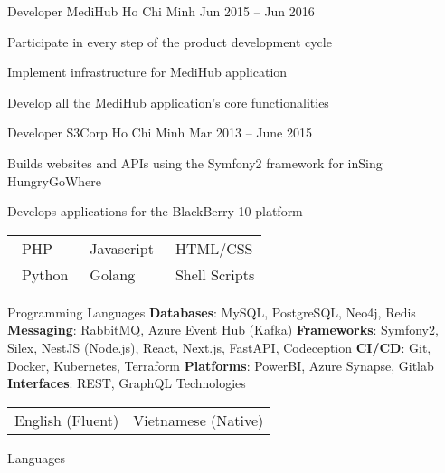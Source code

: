 \documentclass[]{awesome-cv}
\begin{document}
\begin{cventries}
{\begin{cvitems}
		\end{cvitems}}
	\cventry
	{Developer}
	{MediHub}
	{Ho Chi Minh}
	{Jun 2015 – Jun 2016}
	{\begin{cvitems}
		\item {Participate in every step of the product development cycle}
		\item {Implement infrastructure for MediHub application}
		\item {Develop all the MediHub application's core functionalities}
		\end{cvitems}}
	\cventry
	{Developer}
	{S3Corp}
	{Ho Chi Minh}
	{Mar 2013 – June 2015}
	{
		\begin{cvitems}
			\item {Builds websites and APIs using the Symfony2 framework for inSing HungryGoWhere}
			\item {Develops applications for the BlackBerry 10 platform}
		\end{cvitems}
	}
\end{cventries}
\begin{cventries}
	\cventry
	{\def\arraystretch{1.15}{\begin{tabular}{p{3cm}@{\hspace{0.1cm}} @{\hspace{0.1cm}}p{3cm}@{\hspace{0.1cm}} @{\hspace{0.1cm}}p{3cm}@{\hspace{0.1cm}} }
		{\faStar \, PHP} & {\faStarHalfO \, Javascript} & {\faStarHalfO \, HTML/CSS} \\
		{\faStarHalfO \, Python} & {\faStarHalfO \, Golang} & {\faStarHalfO \, Shell Scripts} \\
		\end{tabular}}}
	{Programming Languages}
	{}
	{}
	{}
	\cventry
	{
		\textbf{Databases}: MySQL, PostgreSQL, Neo4j, Redis \break
		\textbf{Messaging}: RabbitMQ, Azure Event Hub (Kafka) \break
		\textbf{Frameworks}: Symfony2, Silex, NestJS (Node.js), React, Next.js, FastAPI, Codeception \break
		\textbf{CI/CD}: Git, Docker, Kubernetes, Terraform \break
		\textbf{Platforms}: PowerBI, Azure Synapse, Gitlab \break
		\textbf{Interfaces}: REST, GraphQL
	}
	{Technologies}
	{}
	{}
	{}
	\cventry
	{\def\arraystretch{1.15}{\begin{tabular}{p{3cm}@{\hspace{0.1cm}} @{\hspace{0.1cm}}p{3cm}@{\hspace{0.1cm}}}
		{English (Fluent)} & {Vietnamese (Native)} \\
		\end{tabular}}}
	{Languages}
	{}
	{}
	{}
\end{cventries}
\end{document}
